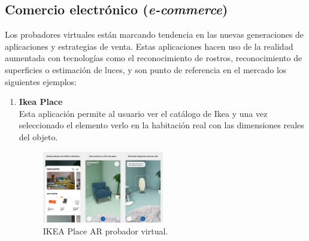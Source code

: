 \subsection{Comercio electrónico (\textit{e-commerce})}\label{ecommerce}
Los probadores virtuales están marcando tendencia en las nuevas generaciones de aplicaciones y estrategias de venta. Estas aplicaciones hacen uso de la realidad aumentada con tecnologías como el reconocimiento de rostros, reconocimiento de superficies o estimación de luces, y son punto de referencia en el mercado los siguientes ejemplos:
\begin{enumerate}[label={\arabic*.}]
\item \textbf{Ikea Place}\\
Esta aplicación permite al usuario ver el catálogo de Ikea y una vez seleccionado el elemento verlo en la habitación real con las dimensiones reales del objeto.
\begin{figure}[H]
     \centering
     \includegraphics[width=0.5\textwidth]{Images/Ikea_App.jpeg}
     \caption[IKEA Place AR probador virtual]{IKEA Place AR probador virtual\footnotemark.}
     \label{fig:Ikea}
 \end{figure}
 

\end{enumerate}
